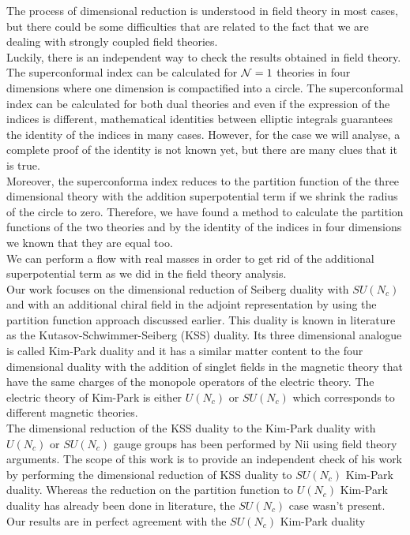The process of dimensional reduction is understood in field theory in most cases, but there could be some difficulties that are related to the fact that we are dealing with strongly coupled field theories.\\
Luckily, there is an independent way to check the results obtained in  field theory.\\
The superconformal index can be calculated for $\mathcal{N}=1$ theories in four dimensions where one dimension is compactified into a circle. 
The superconformal index can be calculated for both dual theories and even if the expression of the indices is different, mathematical identities between elliptic integrals guarantees the identity of the indices in many cases.  
However, for the case we will analyse, a complete proof of the identity is not  known yet, but there are many clues that it is true.\\
Moreover, the superconforma index reduces to the partition function of the three dimensional theory with the addition superpotential term if we shrink the radius of the circle to zero.  
Therefore, we have found a method to calculate the partition functions of the two theories and by the identity of the indices in four dimensions we known that they are equal too.\\
We can perform a flow with real masses in order to get rid of the additional superpotential term as we did in the field theory analysis.\\

Our work focuses on the dimensional reduction of Seiberg duality with $SU(N_c)$ and with an additional chiral field in the adjoint representation by using the partition function approach discussed earlier.
This duality is known in literature as the Kutasov-Schwimmer-Seiberg (KSS) duality.
Its three dimensional analogue is called Kim-Park duality and it has a similar matter content to the four dimensional duality with the addition of singlet fields in the magnetic theory that have the same charges of the monopole operators of the electric theory.
The electric theory of Kim-Park is either $U(N_c)$ or $SU(N_c)$ which corresponds to different magnetic theories. 
 \\
The dimensional reduction of the KSS duality to the Kim-Park duality with $U(N_c)$ or $SU(N_c)$ gauge groups has been performed by Nii using field theory arguments.
The scope of this work is to provide an independent check of his work by performing the dimensional reduction of KSS duality to $SU(N_c)$ Kim-Park duality.
Whereas the reduction on the partition function to $U(N_c)$ Kim-Park duality has already been done in literature, the $SU(N_c)$ case wasn't present.\\




Our results are in perfect agreement with the $SU(N_c)$ Kim-Park duality 





